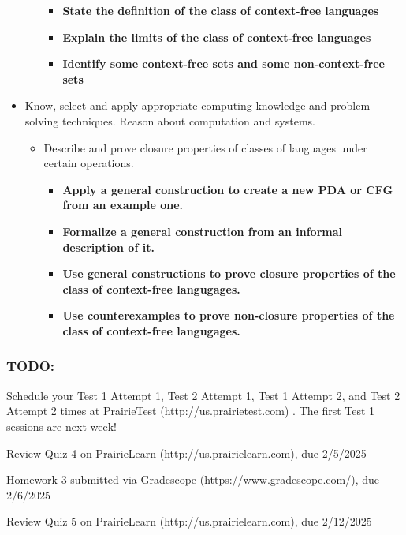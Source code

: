 \begin{itemize}
\begin{itemize}
\begin{itemize}
          \item {\bf State the definition of the class of context-free languages}
          \item {\bf Explain the limits of the class of context-free languages}
          \item {\bf Identify some context-free sets and some non-context-free sets}
       \end{itemize}
    \end{itemize}
    \item Know, select and apply appropriate computing knowledge and problem-solving techniques. 
    Reason about computation and systems.
    \begin{itemize}
        \item Describe and prove closure properties of classes of languages under certain operations.
        \begin{itemize}
            \item {\bf Apply a general construction to create a new PDA or CFG from an example one.}
            \item {\bf Formalize a general construction from an informal description of it.}
            \item {\bf Use general constructions to prove closure properties of the class of context-free langugages.}
            \item {\bf Use counterexamples to prove non-closure properties of the class of context-free langugages.}
        \end{itemize}
    \end{itemize}
\end{itemize}

\vspace{-20pt}

\subsubsection*{TODO:}
\begin{list}{\itemsep-10pt}
   \item Schedule your Test 1 Attempt 1, Test 2 Attempt 1, Test 1 Attempt 2, and Test 2 Attempt 2 times
   at PrairieTest (http://us.prairietest.com) . The first Test 1 sessions are next week!
   \item Review Quiz 4 on PrairieLearn (http://us.prairielearn.com), due 2/5/2025
   \item Homework 3 submitted via Gradescope (https://www.gradescope.com/), due 2/6/2025
   \item Review Quiz 5 on PrairieLearn (http://us.prairielearn.com), due 2/12/2025
\end{list}

